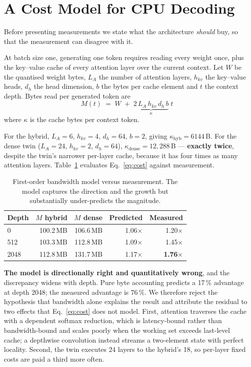 \documentclass[conference]{IEEEtran}
\begin{document}
\section{A Cost Model for CPU Decoding}

Before presenting measurements we state what the architecture \emph{should} buy,
so that the measurement can disagree with it.

At batch size one, generating one token requires reading every weight once, plus
the key--value cache of every attention layer over the current context. Let
$W$ be the quantised weight bytes, $L_A$ the number of attention layers,
$h_{kv}$ the key--value heads, $d_h$ the head dimension, $b$ the bytes per cache
element and $t$ the context depth. Bytes read per generated token are
\begin{equation}
M(t) \;=\; W \;+\; \underbrace{2\,L_A\,h_{kv}\,d_h\,b}_{\textstyle \kappa}\;t
\label{eq:cost}
\end{equation}
where $\kappa$ is the cache bytes per context token.

For the hybrid, $L_A=6$, $h_{kv}=4$, $d_h=64$, $b=2$, giving
$\kappa_{\text{hyb}} = 6144$\,B. For the dense twin ($L_A=24$, $h_{kv}=2$,
$d_h=64$), $\kappa_{\text{dense}} = 12{,}288$\,B --- \textbf{exactly twice},
despite the twin's narrower per-layer cache, because it has four times as many
attention layers. Table~\ref{tab:model} evaluates
Eq.~\eqref{eq:cost} against measurement.

\begin{table}[t]
\caption{First-order bandwidth model versus measurement. The model captures the
direction and the growth but substantially under-predicts the magnitude.}
\label{tab:model}
\centering
\begin{tabular}{@{}lrrrr@{}}
\toprule
\textbf{Depth} & \textbf{$M$ hybrid} & \textbf{$M$ dense} & \textbf{Predicted} & \textbf{Measured} \\
\midrule
0    & 100.2\,MB & 106.6\,MB & 1.06$\times$ & 1.20$\times$ \\
512  & 103.3\,MB & 112.8\,MB & 1.09$\times$ & 1.45$\times$ \\
2048 & 112.8\,MB & 131.7\,MB & 1.17$\times$ & \textbf{1.76}$\times$ \\
\bottomrule
\end{tabular}
\end{table}

\textbf{The model is directionally right and quantitatively wrong}, and the
discrepancy widens with depth. Pure byte accounting predicts a 17\,\% advantage
at depth 2048; the measured advantage is 76\,\%. We therefore reject the
hypothesis that bandwidth alone explains the result and attribute the residual to
two effects that Eq.~\eqref{eq:cost} does not model. First, attention traverses
the cache with a dependent softmax reduction, which is latency-bound rather than
bandwidth-bound and scales poorly when the working set exceeds last-level cache;
a depthwise convolution instead streams a two-element state with perfect
locality. Second, the twin executes 24 layers to the hybrid's 18, so per-layer
fixed costs are paid a third more often.
\end{document}
